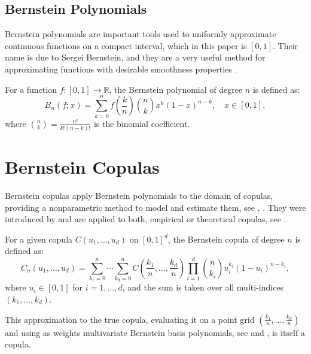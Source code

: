 \documentclass[
	11pt, %
	fleqn, %
	a4paper, %
]{LegrandOrangeBook}
\begin{document}
\subsection{Bernstein Polynomials}

Bernstein polynomials are important tools used to uniformly approximate continuous functions on a compact interval, which in this paper is $[0,1]$. Their name is due to Sergei Bernstein, and they are a very useful method for approximating functions with desirable smoothness properties \cite{Lorentz1986}.

\begin{definition}
\label{def:bernstein}
For a function $f : [0,1] \to \mathbb{R}$, the Bernstein polynomial of degree $n$ is defined as:
\begin{equation}
B_n(f; x) = \sum_{k=0}^n f\left(\frac{k}{n}\right) \binom{n}{k} x^k (1-x)^{n-k}, \quad x \in [0,1],
\label{eq:bernsteinpolynomial}
\end{equation}
where $\binom{n}{k} = \frac{n!}{k!(n-k)!}$ is the binomial coefficient.
\end{definition}

\section{Bernstein Copulas}
Bernstein copulas apply Bernstein polynomials to the domain of copulas, providing a nonparametric method to model and estimate them, see \cite{Nelsen2006}, \cite{Joe2014}. They were introduced by \cite{sancetta2004} and are applied to both, empirical or theoretical copulas, see \cite{Janssen2013}.

\begin{definition}
\label{def:bernsteincopula}
For a given copula $C(u_1,\ldots,u_d)$ on $[0,1]^d$, the Bernstein copula of degree $n$ is defined as:
\begin{equation}
C_n(u_1,\ldots,u_d) = \sum_{k_1=0}^n \cdots \sum_{k_d=0}^n C\left(\frac{k_1}{n},\ldots,\frac{k_d}{n}\right) \prod_{i=1}^d \binom{n}{k_i} u_i^{k_i} (1-u_i)^{n-k_i},
\label{eq:bernsteincopula}
\end{equation}
where $u_i \in [0,1]$ for $i = 1,\ldots,d$, and the sum is taken over all multi-indices $(k_1,\ldots, k_d)$.
\end{definition}

This approximation to the true copula, evaluating it on a point grid $\left(\frac{k_1}{n},\ldots,\frac{k_d}{n}\right)$ and using as weights multivariate Bernstein basis polynomials, see \cite{sancetta2004} and \cite{Durrleman2000}, is itself a copula.
\end{document}
